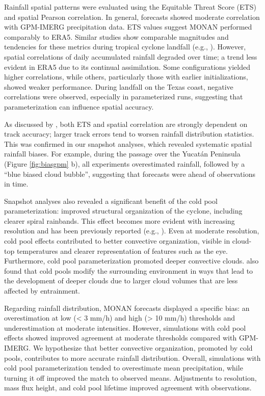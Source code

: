 Rainfall spatial patterns were evaluated using the Equitable Threat Score (ETS) and spatial Pearson correlation. In general, forecasts showed moderate correlation with GPM-IMERG precipitation data. ETS values suggest MONAN performed comparably to ERA5. Similar studies show comparable magnitudes and tendencies for these metrics during tropical cyclone landfall (e.g., ). However, spatial correlations of daily accumulated rainfall degraded over time; a trend less evident in ERA5 due to its continual assimilation. Some configurations yielded higher correlations, while others, particularly those with earlier initializations, showed weaker performance. During landfall on the Texas coast, negative correlations were observed, especially in parameterized runs, suggesting that parameterization can influence spatial accuracy.

As discussed by , both ETS and spatial correlation are strongly dependent on track accuracy; larger track errors tend to worsen rainfall distribution statistics. This was confirmed in our snapshot analyses, which revealed systematic spatial rainfall biases. For example, during the passage over the Yucatán Peninsula (Figure \ref{fig:biasgpm} b), all experiments overestimated rainfall, followed by a “blue biased cloud bubble”, suggesting that forecasts were ahead of observations in time.

Snapshot analyses also revealed a significant benefit of the cold pool parameterization: improved structural organization of the cyclone, including clearer spiral rainbands. This effect becomes more evident with increasing resolution and has been previously reported (e.g., \cite{sawada2010impactsPT2, freitas2024parameterization}). Even at moderate resolution, cold pool effects contributed to better convective organization, visible in cloud-top temperatures and clearer representation of features such as the eye. Furthermore, cold pool parameterization promoted deeper convective clouds.  also found that cold pools modify the surrounding environment in ways that lead to the development of deeper clouds due to larger cloud volumes that are less affected by entrainment.

Regarding rainfall distribution, MONAN forecasts displayed a specific bias: an overestimation at low (< 3 mm/h) and high (> 10 mm/h) thresholds and underestimation at moderate intensities. However, simulations with cold pool effects showed improved agreement at moderate thresholds compared with GPM-IMERG. We hypothesize that better convective organization, promoted by cold pools, contributes to more accurate rainfall distribution. Overall, simulations with cold pool parameterization tended to overestimate mean precipitation, while turning it off improved the match to observed means. Adjustments to resolution, mass flux height, and cold pool lifetime improved agreement with observations.

